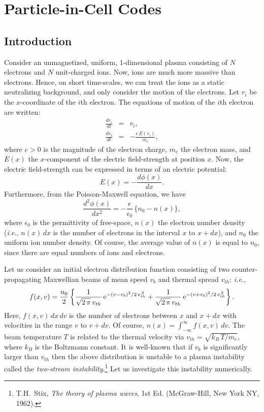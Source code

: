 \chapter{Particle-in-Cell Codes}
\section{Introduction}
Consider an unmagnetized, uniform, 1-dimensional plasma consisting of $N$ electrons and $N$ unit-charged 
ions.
Now,  ions are much more massive than  electrons.
Hence, on short time-scales, we can treat the ions as a static 
neutralizing background, and only consider the motion of the electrons. Let $r_i$ be the
$x$-coordinate of the $i$th electron. The equations of motion of the
$i$th electron are written:
\begin{eqnarray}
\frac{dr_i}{dt} &=& v_i,\\[0.5ex]
\frac{dv_i}{dt} &=& - \frac{e\,E(r_i)}{m_e},
\end{eqnarray}
where $e>0$ is the magnitude of the electron charge, $m_e$  the electron mass, and $E(x)$  the $x$-component
of the electric field-strength at position $x$. Now, the electric field-strength can be
expressed in terms of an electric
potential:
\begin{equation}
E(x) = - \frac{d\phi(x)}{dx}.
\end{equation}
Furthermore, from the Poisson-Maxwell equation, we have
\begin{equation}
\frac{d^2\phi(x)}{dx^2} = -\frac{e}{\epsilon_0}\,\{n_0- n(x)\},
\end{equation}
where $\epsilon_0$ is the permittivity of free-space, $n(x)$  the electron number
density ({\em i.e.}, $n(x)\,dx$ is the number of electrons in the interval $x$ to $x+dx$),
and $n_0$  the uniform ion number density. Of course, the average value of $n(x)$ is
equal to $n_0$, since there are equal numbers of ions and electrons. 

Let us consider an initial electron distribution function consisting of two counter-propagating
Maxwellian beams of mean speed $v_b$ and thermal spread $v_{th}$: {\em i.e.},
\begin{equation}
f(x,v) = \frac{n_0}{2}\left\{\frac{1}{\sqrt{2\,\pi}\,v_{th}}
\,{\rm e}^{-(v-v_b)^2/2\,v_{th}^{\,2}}+ \frac{1}{\sqrt{2\,\pi}\,v_{th}}\,{\rm e}^{-(v+v_b)^2/2\,v_{th}^{\,2}}
\right\}.
\end{equation}
Here, $f(x,v)\,dx\,dv$ is the number of electrons between $x$ and $x+dx$ with velocities
in the range $v$ to $v+dv$. Of course, $n(x) = \int_{-\infty}^{\infty} f(x,v)\,dv$.
The beam temperature $T$ is related to the thermal velocity via $v_{th} = \sqrt{k_B\,T/m_e}$,
where $k_B$ is the Boltzmann constant. It is well-known that if $v_b$ is significantly
larger than $v_{th}$ then the above distribution is unstable to a plasma instability
called the {\em two-stream instability}.\footnote{T.H.~Stix, {\em The theory of plasma waves}, 1st Ed.
(McGraw-Hill, New York NY, 1962).} Let us investigate this instability numerically.

